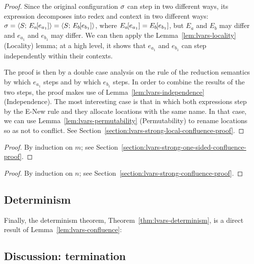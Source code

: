 \LVarsLemStrongLocalConfluence
\begin{proof}
  Since the original configuration $\sigma$ can step in two different
  ways, its expression decomposes into redex and context in two
  different ways: $\sigma = \langle S;\, E_a\hspace{-1mm}\left[e_{a_1}\right] \rangle =
  \langle S;\, E_b\hspace{-1mm}\left[e_{b_1}\right] \rangle$, where $E_a\hspace{-1mm}\left[e_{a_1}\right]
  = E_b\hspace{-1mm}\left[e_{b_1}\right]$, but $E_a$ and $E_b$ may differ and
  $e_{a_1}$ and $e_{b_1}$ may differ.  We can then apply the
  Lemma~\ref{lem:lvars-locality} (Locality) lemma; at a high level, it
  shows that $e_{a_1}$ and $e_{b_1}$ can step independently within
  their contexts.

  The proof is then by a double case analysis on the rule of the
  reduction semantics by which $e_{a_1}$ steps and by which $e_{b_1}$
  steps.  In order to combine the results of the two steps, the proof
  makes use of Lemma~\ref{lem:lvars-independence} (Independence).  The
  most interesting case is that in which both expressions step by the
  {\sc E-New} rule and they allocate locations with the same name.  In
  that case, we can use Lemma~\ref{lem:lvars-permutability}
  (Permutability) to rename locations so as not to conflict.  See
  Section~\ref{section:lvars-strong-local-confluence-proof}.
\end{proof}

\LVarsLemStrongOneSidedConfluence
\begin{proof}
  By induction on $m$; see
  Section~\ref{section:lvars-strong-one-sided-confluence-proof}.
\end{proof}

\LVarsLemStrongConfluence
\begin{proof}
  By induction on $n$; see
  Section~\ref{section:lvars-strong-confluence-proof}.
\end{proof}

\LVarsLemConfluence

\subsection{Determinism}

Finally, the determinism theorem, Theorem~\ref{thm:lvars-determinism},
is a direct result of Lemma~\ref{lem:lvars-confluence}:

\LVarsThmDeterminism

\subsection{Discussion: termination}

